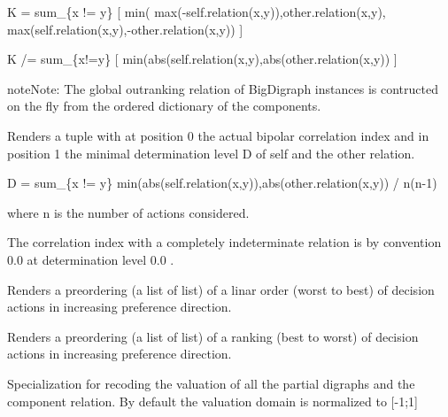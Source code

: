 \documentclass[letterpaper,10pt,english]{sphinxmanual}
\begin{document}
\begin{fulllineitems}
\begin{fulllineitems}
K = sum\_\{x != y\} {[} min( max(-self.relation(x,y)),other.relation(x,y), max(self.relation(x,y),-other.relation(x,y)) {]}

K /= sum\_\{x!=y\} {[} min(abs(self.relation(x,y),abs(other.relation(x,y)) {]}

\begin{notice}{note}{Note:}
The global outranking relation of BigDigraph instances is contructed on the fly
from the ordered dictionary of the components.

Renders a tuple with at position 0 the actual bipolar correlation index
and in position 1 the minimal determination level D of self and
the other relation.

D = sum\_\{x != y\} min(abs(self.relation(x,y)),abs(other.relation(x,y)) / n(n-1)

where n is the number of actions considered.

The correlation index with a completely indeterminate relation
is by convention 0.0 at determination level 0.0 .
\end{notice}

\end{fulllineitems}


\begin{fulllineitems}
\label{techDoc:bigOutrankingDigraphs.BigDigraph.ordering2Preorder}
Renders a preordering (a list of list) of a linar order (worst to best) of decision actions in increasing preference direction.

\end{fulllineitems}


\begin{fulllineitems}
\label{techDoc:bigOutrankingDigraphs.BigDigraph.ranking2Preorder}
Renders a preordering (a list of list) of a ranking (best to worst) of decision actions in increasing preference direction.

\end{fulllineitems}


\begin{fulllineitems}
\label{techDoc:bigOutrankingDigraphs.BigDigraph.recodeValuation}
Specialization for recoding the valuation of all the partial digraphs and the component relation.
By default the valuation domain is normalized to {[}-1;1{]}


\end{fulllineitems}
\end{fulllineitems}
\end{document}
